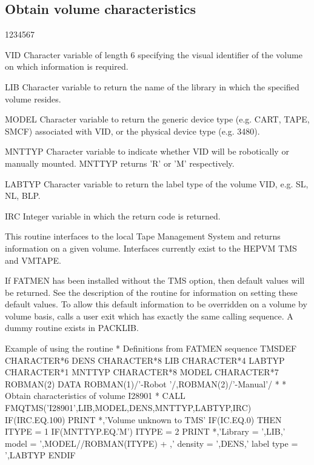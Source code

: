 \subsection{Obtain volume characteristics}
\begin{DLtt}{1234567}
\item[VID]
Character variable of length 6 specifying the visual identifier
of the volume on which information is required.
\item[LIB]
Character variable to return the name of the library in which
the specified volume resides.
\item[MODEL]
Character variable to return the generic device type (e.g. CART,
TAPE, SMCF) associated with VID, or the physical device type (e.g. 3480).
\item[MNTTYP]
Character variable to indicate whether VID will be robotically
or manually mounted. MNTTYP returns 'R' or 'M' respectively.
\item[LABTYP]
Character variable to return the label type of the volume VID,
e.g. SL, NL, BLP.
\item[IRC]
Integer variable in which the return code is returned.
\end{DLtt}
\par
This routine interfaces to the local Tape Management System
and returns information on a given volume. 
Interfaces currently exist to the HEPVM TMS and VMTAPE.
\par
If FATMEN has been
installed without the TMS option, then default values
will be returned. See the description of the  routine
for information on setting these default values.
To allow this default information to be overridden on a volume
by volume basis,  calls a user exit  which has
exactly the same calling sequence. A dummy  routine
exists in PACKLIB.
\begin{XMPt}{Example of using the routine \protect{}}
* Definitions from FATMEN sequence TMSDEF
      CHARACTER*6  DENS
      CHARACTER*8  LIB
      CHARACTER*4  LABTYP
      CHARACTER*1  MNTTYP
      CHARACTER*8  MODEL
      CHARACTER*7  ROBMAN(2)
      DATA         ROBMAN(1)/'-Robot '/,ROBMAN(2)/'-Manual'/
*
*     Obtain characteristics of volume I28901
*
      CALL FMQTMS('I28901',LIB,MODEL,DENS,MNTTYP,LABTYP,IRC)
      IF(IRC.EQ.100) PRINT *,'Volume unknown to TMS'
            IF(IC.EQ.0) THEN
              ITYPE = 1
              IF(MNTTYP.EQ.'M') ITYPE = 2
              PRINT *,'Library = ',LIB,' model = ',MODEL//ROBMAN(ITYPE)
     +               ,' density = ',DENS,' label type = ',LABTYP
              ENDIF
\end{XMPt}
